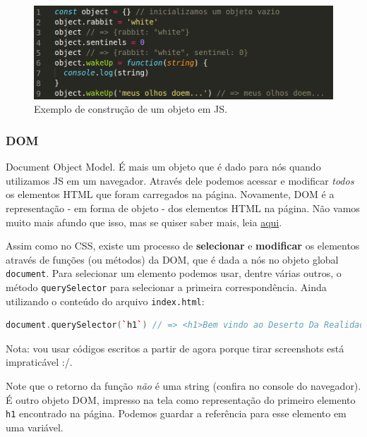 \begin{figure}[h!]
    \centering
    \includegraphics[scale=.4]{imgs/empty-object.png}
    \caption{ Exemplo de construção de um objeto em JS. }
    \label{fig:empty-object}
\end{figure}


\subsubsection{DOM}
Document Object Model. É mais um objeto que é dado para nós quando
utilizamos JS em um navegador. Através dele podemos acessar e modificar
\emph{todos} os elementos HTML que foram carregados na página.
Novamente, DOM é a representação - em forma de objeto - dos elementos
HTML na página. Não vamos muito mais afundo que isso, mas se quiser
saber mais, leia
\href{https://developer.mozilla.org/en-US/docs/Web/API/Document_Object_Model/Introduction}{aqui}.

Assim como no CSS, existe um processo de \textbf{selecionar} e
\textbf{modificar} 
os elementos através de funções (ou métodos) da DOM,
que é dada a nós no objeto global \texttt{document}. Para selecionar um
elemento podemos usar, dentre várias outros, o método
\texttt{querySelector} para selecionar a primeira correspondência. Ainda
utilizando o conteúdo do arquivo \texttt{index.html}: \\

\begin{lstlisting}[language=C++]
document.querySelector(`h1`) // => <h1>Bem vindo ao Deserto Da Realidade</h1>
\end{lstlisting}


\hfill

Nota: vou usar códigos escritos a partir de agora porque tirar screenshots está impraticável :/.

Note que o retorno da função \emph{não} é uma string (confira no console do navegador). É outro objeto
DOM, impresso na tela como representação do primeiro elemento
\texttt{h1} encontrado na página. Podemos guardar a referência para esse
elemento em uma variável. \\


